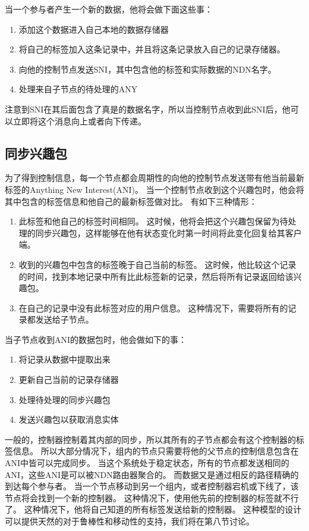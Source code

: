 当一个参与者产生一个新的数据，他将会做下面这些事：
\begin{enumerate}
  \item 添加这个数据进入自己本地的数据存储器
  \item 将自己的标签加入这条记录中，并且将这条记录放入自己的记录存储器。
  \item 向他的控制节点发送SNI，其中包含他的标签和实际数据的NDN名字。
  \item 处理来自子节点的待处理的ANY
\end{enumerate}

注意到SNI在其后面包含了真是的数据名字，所以当控制节点收到此SNI后，他可以立即将这个消息向上或者向下传递。

\subsection{同步兴趣包}
为了得到控制信息，每一个节点都会周期性的向他的控制节点发送带有他当前最新标签的Anything New Interest(ANI)。
当一个控制节点收到这个兴趣包时，他会将其中包含的标签信息和他自己的最新标签做对比。
有如下三种情形：
\begin{enumerate}
  \item 此标签和他自己的标签时间相同。
这时候，他将会把这个兴趣包保留为待处理的同步兴趣包，这样能够在他有状态变化时第一时间将此变化回复给其客户端。
  \item 收到的兴趣包中包含的标签晚于自己当前的标签。
这时候，他比较这个记录的时间，找到本地记录中所有比此标签新的记录，然后将所有记录返回给该兴趣包。
  \item 在自己的记录中没有此标签对应的用户信息。
这种情况下，需要将所有的记录都发送给子节点。
\end{enumerate}

当子节点收到ANI的数据包时，他会做如下的事：
\begin{enumerate}
  \item 将记录从数据中提取出来
  \item 更新自己当前的记录存储器
  \item 处理待处理的同步兴趣包
  \item 发送兴趣包以获取消息实体
\end{enumerate}

一般的，控制器控制着其内部的同步，所以其所有的子节点都会有这个控制器的标签信息。
所以大部分情况下，组内的节点只需要将他的父节点的控制信息包含在ANI中皆可以完成同步。
当这个系统处于稳定状态，所有的节点都发送相同的ANI，这些ANI是可以被NDN路由器聚合的。
而数据又是通过相反的路径精确的到达每个参与者。
当一个节点移动到另一个组内，或者控制器宕机或下线了，该节点将会找到一个新的控制器。
这种情况下，使用他先前的控制器的标签就不行了。
这种情况下，他将自己知道的所有标签发送给新的控制器。
这种模型的设计可以提供天然的对于鲁棒性和移动性的支持，我们将在第八节讨论。

